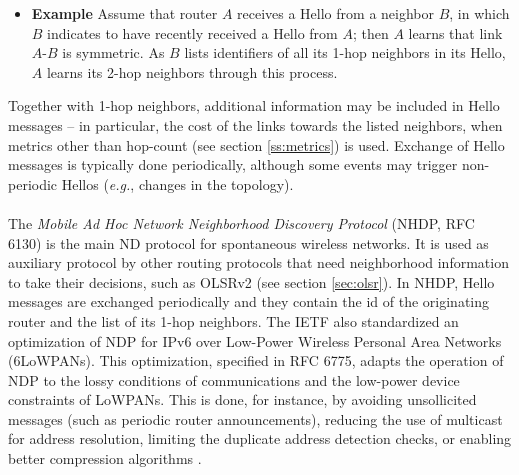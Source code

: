 \begin{itemize}
\item {\bf Example} Assume that router $A$ receives a Hello from a neighbor $B$, in which $B$ indicates to have recently received a Hello from $A$; then $A$ learns that link $A$-$B$ is symmetric. As $B$ lists identifiers of all its 1-hop neighbors in its Hello, $A$ learns its 2-hop neighbors through this process.
\end{itemize}

Together with 1-hop neighbors, additional information may be included in Hello messages -- in particular, the cost of the links towards the listed neighbors, when metrics other than hop-count (see section \ref{ss:metrics}) is used. Exchange of Hello messages is typically done periodically, although some events may trigger non-periodic Hellos ({\em e.g.}, changes in the topology). \ \\ \ \\ %
%
The {\em Mobile Ad Hoc Network Neighborhood Discovery Protocol} (NHDP, RFC 6130) \cite{NHDP-RFC6130} is the main ND protocol for spontaneous wireless networks. It is used as auxiliary protocol by other routing protocols that need neighborhood information to take their decisions, such as OLSRv2 (see section \ref{sec:olsr}). In NHDP, Hello messages are exchanged periodically and they contain the id of the originating router and the list of its 1-hop neighbors. The IETF also standardized an optimization of NDP for IPv6 over Low-Power Wireless Personal Area Networks (6LoWPANs). This optimization, specified in RFC 6775, adapts the operation of NDP to the lossy conditions of communications and the low-power device constraints of LoWPANs. This is done, for instance, by avoiding unsollicited messages (such as periodic router announcements), reducing the use of multicast for address resolution, limiting the duplicate address detection checks, or enabling better compression algorithms \cite{rfc6775}. \ \\ \ \\
%
%
